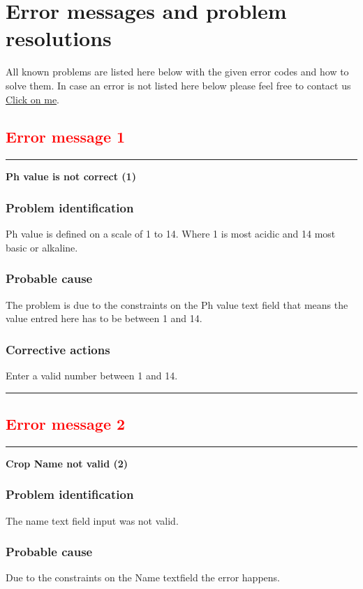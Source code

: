 
\chapter{Error messages and problem resolutions}
\label{chap:error_messages}

All known problems are listed here below with the given error codes and how to
solve them. In case an error is not listed here below please feel free to
contact us \hyperref[sec:Contact]{Click on me}.


\section{\textbf{\textcolor{red}{Error message 1}}}
\hrule
\vspace{0.5cm}
\textbf{Ph value is not correct (1)}
\subsection{Problem identification}
Ph value is defined on a scale of 1 to 14.  Where 1 is most acidic and 14 most
basic or alkaline.

\subsection{Probable cause}

The problem is due to the constraints on the Ph value text field that means the
value entred here has to be between 1 and 14.

\subsection{Corrective actions}
Enter a valid number between 1 and 14.
\vspace{0.5cm}
\hrule


\break

\section{\textbf{\textcolor{red}{Error message 2}}}
\hrule
\vspace{0.5cm}
\textbf{Crop Name not valid (2)}
\subsection{Problem identification}
The name text field input was not valid.

\subsection{Probable cause}
Due to the constraints on the Name textfield the error happens.

